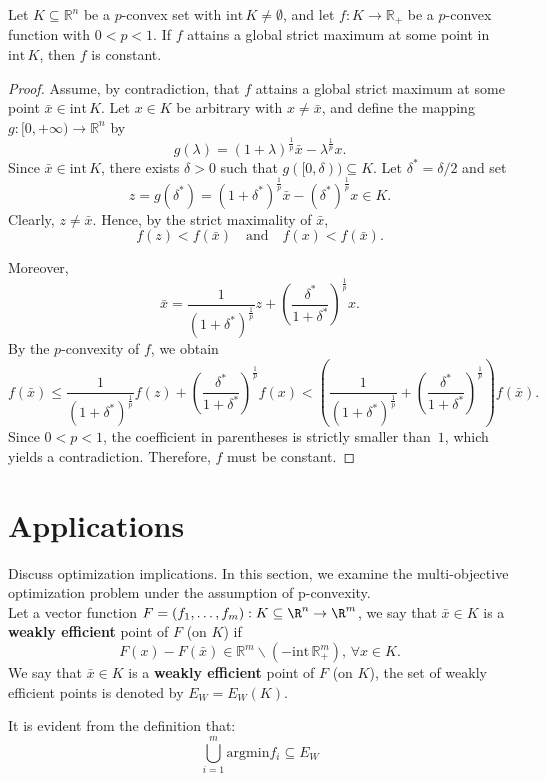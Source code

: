 \documentclass[10pt]{article}
\begin{document}
\begin{theorem}
Let $K \subseteq \mathbb{R}^{n}$ be a $p$-convex set with $\mathrm{int}\, K \neq \emptyset$, and let
$f : K \rightarrow \mathbb{R}_{+}$ be a $p$-convex function with $0 < p < 1$.
If $f$ attains a global strict maximum at some point in $\mathrm{int}\, K$, then $f$ is constant.
\end{theorem}

\begin{proof}
Assume, by contradiction, that $f$ attains a global strict maximum at some point
$\bar{x} \in \mathrm{int}\, K$.
Let $x \in K$ be arbitrary with $x \neq \bar{x}$, and define the mapping
$g : [0,+\infty) \rightarrow \mathbb{R}^{n}$ by
\[
g(\lambda) = (1+\lambda)^{\frac{1}{p}} \bar{x} - \lambda^{\frac{1}{p}} x .
\]
Since $\bar{x} \in \mathrm{int}\, K$, there exists $\delta > 0$ such that
$g([0,\delta)) \subseteq K$. Let $\delta^{\ast} = \delta/2$ and set
\[
z = g(\delta^{\ast})
= (1+\delta^{\ast})^{\frac{1}{p}} \bar{x}
- (\delta^{\ast})^{\frac{1}{p}} x \in K.
\]
Clearly, $z \neq \bar{x}$. Hence, by the strict maximality of $\bar{x}$,
\[
f(z) < f(\bar{x})
\quad \text{and} \quad
f(x) < f(\bar{x}).
\]

Moreover,
\[
\bar{x}
= \frac{1}{(1+\delta^{\ast})^{\frac{1}{p}}} z
+ \left( \frac{\delta^{\ast}}{1+\delta^{\ast}} \right)^{\frac{1}{p}} x.
\]
By the $p$-convexity of $f$, we obtain
\[
f(\bar{x})
\le
\frac{1}{(1+\delta^{\ast})^{\frac{1}{p}}} f(z)
+ \left( \frac{\delta^{\ast}}{1+\delta^{\ast}} \right)^{\frac{1}{p}} f(x)
<
\left(
\frac{1}{(1+\delta^{\ast})^{\frac{1}{p}}}
+
\left( \frac{\delta^{\ast}}{1+\delta^{\ast}} \right)^{\frac{1}{p}}
\right) f(\bar{x}).
\]
Since $0 < p < 1$, the coefficient in parentheses is strictly smaller than~$1$,
which yields a contradiction. Therefore, $f$ must be constant.
\end{proof}

\section{Applications}
Discuss optimization implications.
In this section, we examine the multi-objective optimization problem under the assumption of p-convexity.\\
 Let a vector function $F=(f_{1},\ldots,f_{m}): K\subseteq \R^{n} \rightarrow \R^{m}$, we say that $\bar{x}\in K$ is a {\bf weakly efficient} point of $F$ (on $K$) if
\begin{equation}
F(x)-F(\bar{x})\in \mathbb{R}^m\backslash(-\mathrm{int}\,\mathbb{R}^m_+),\, \forall x\in K.
\label{VP1}
\end{equation}
 We say that $\bar{x}\in K$ is a {\bf weakly efficient} point of $F$ (on $K$), the set of weakly efficient points is denoted by $E_{W}=E_{W}(K)$.
\begin{remark}
It is evident from the definition that:
$$\displaystyle \bigcup_{i=1}^{m}\mathrm{argmin}{f_{i}}\subseteq E_{W}$$
\label{observacion inclusion}
\end{remark}
\end{document}
